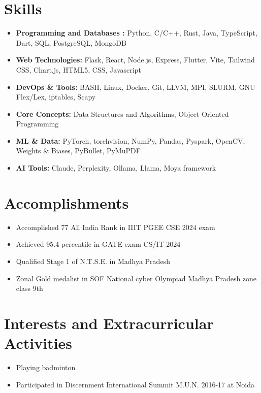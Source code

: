 \documentclass{article}
\begin{document}
\section*{Skills}
\begin{itemize}[leftmargin=*, itemsep=0pt, parsep=0pt]
	\item \textbf{Programming and Databases :} Python, C/C++, Rust, Java, TypeScript, Dart, SQL, PostgreSQL, MongoDB
	\item \textbf{Web Technologies:} Flask, React, Node.js, Express, Flutter, Vite, Tailwind CSS, Chart.js, HTML5, CSS, Javascript
	\item \textbf{DevOps \& Tools:} BASH, Linux, Docker, Git, LLVM, MPI, SLURM, GNU Flex/Lex, iptables, Scapy
	\item \textbf{Core Concepts:} Data Structures and Algorithms, Object Oriented Programming
	\item \textbf{ML \& Data:} PyTorch, torchvision, NumPy, Pandas, Pyspark, OpenCV, Weights \& Biases, PyBullet, PyMuPDF
	\item \textbf{AI Tools:} Claude, Perplexity, Ollama, Llama, Moya framework
\end{itemize}

\section*{Accomplishments}
\begin{itemize}
	\item Accomplished 77 All India Rank in IIIT PGEE CSE 2024 exam
	\item Achieved 95.4 percentile in GATE exam CS/IT 2024
	\item Qualified Stage 1 of N.T.S.E. in Madhya Pradesh
	\item Zonal Gold medalist in SOF National cyber Olympiad Madhya Pradesh zone class 9th
\end{itemize}

\section*{Interests and Extracurricular Activities}
\begin{itemize}
	\item Playing badminton
	\item Participated in Discernment International Summit M.U.N. 2016-17 at Noida
\end{itemize}
\end{document}
